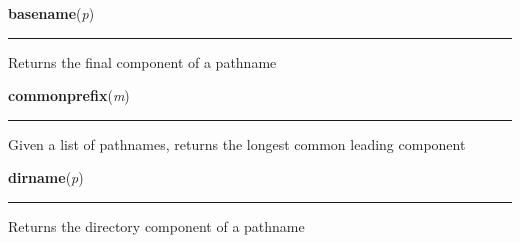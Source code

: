     \label{posixpath:basename}

    \vspace{0.5ex}

\hspace{.8\funcindent}\begin{boxedminipage}{\funcwidth}

    \raggedright \textbf{basename}(\textit{p})

    \vspace{-1.5ex}

    \rule{\textwidth}{0.5\fboxrule}
\setlength{\parskip}{2ex}
    Returns the final component of a pathname

\setlength{\parskip}{1ex}
    \end{boxedminipage}

    \label{genericpath:commonprefix}

    \vspace{0.5ex}

\hspace{.8\funcindent}\begin{boxedminipage}{\funcwidth}

    \raggedright \textbf{commonprefix}(\textit{m})

    \vspace{-1.5ex}

    \rule{\textwidth}{0.5\fboxrule}
\setlength{\parskip}{2ex}
    Given a list of pathnames, returns the longest common leading component

\setlength{\parskip}{1ex}
    \end{boxedminipage}

    \label{posixpath:dirname}

    \vspace{0.5ex}

\hspace{.8\funcindent}\begin{boxedminipage}{\funcwidth}

    \raggedright \textbf{dirname}(\textit{p})

    \vspace{-1.5ex}

    \rule{\textwidth}{0.5\fboxrule}
\setlength{\parskip}{2ex}
    Returns the directory component of a pathname

\setlength{\parskip}{1ex}
    \end{boxedminipage}

